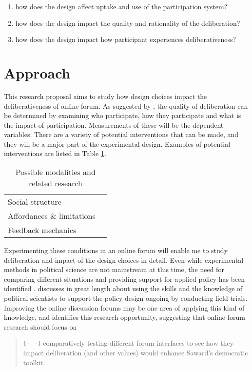 \documentclass{article}
\begin{document}
\begin{enumerate}
\item how does the design affect uptake and use of the participation system?
\item how does the design impact the quality and rationality of the deliberation?
\item how does the design impact how participant experiences deliberativeness?
\end{enumerate}

\section{Approach}
This research proposal aims to study how design choices impact the deliberativeness of online forum. As suggested by , the quality of deliberation can be determined by examining who participate, how they participate and what is the impact of participation. Measurements of these will be the dependent variables. There are a variety of potential interventions that can be made, and they will be a major part of the experimental design. Examples of potential interventions are listed in Table \ref{tab:modalities}.

\begin{table}
\begin{tabular}{l|l}
Social structure & \cite{sukumaran11,underhill03} \\
Affordances \& limitations & \cite{eklundh94,danet98,donath99} \\ 
Feedback mechanics &
\end{tabular} 
\label{tab:modalities}
\caption{Possible modalities and related research}
\end{table}

Experimenting these conditions in an online forum will enable me to study deliberation and impact of the design choices in detail. Even while experimental methods in political science are not mainstream at this time, the need for comparing different situations and providing support for applied policy has been identified \cite{green03}.  discusses in great length about using the skills and the knowledge of political scientists to support the policy design ongoing by conducting field trials. Improving the online discussion forums may be one area of applying this kind of knowledge, and  identifies this research opportunity, suggesting that online forum research should focus on

\begin{quote}
\texttt{[- -]} comparatively testing different forum interfaces to see how they impact deliberation (and other values) would enhance Saward’s democratic toolkit.
\end{quote}
\end{document}

